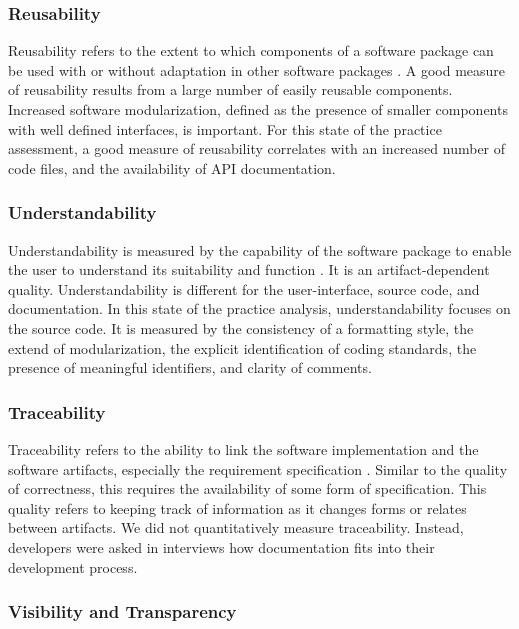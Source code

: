 \documentclass[final, 3p, times, authoryear]{elsarticle}
\begin{document}
\subsubsection{Reusability}

Reusability refers to the extent to which components of a software package can
be used with or without adaptation in other software packages
\citep{kalagiakos2003non}. A good measure of reusability results from a large
number of easily reusable components. Increased software modularization, defined
as the presence of smaller components with well defined interfaces, is
important. For this state of the practice assessment, a good measure of
reusability correlates with an increased number of code files, and the
availability of API documentation.

\subsubsection{Understandability}

Understandability is measured by the capability of the software package to
enable the user to understand its suitability and function \citep{ISO9126}. It
is an artifact-dependent quality. Understandability is different for the
user-interface, source code, and documentation. In this state of the practice
analysis, understandability focuses on the source code. It is measured by the
consistency of a formatting style, the extend of modularization, the explicit
identification of coding standards, the presence of meaningful identifiers, and
clarity of comments. 

\subsubsection{Traceability}

Traceability refers to the ability to link the software implementation and the
software artifacts, especially the requirement specification
\citep{McCallEtAl1977}. Similar to the quality of correctness, this requires the
availability of some form of specification. This quality refers to keeping track
of information as it changes forms or relates between artifacts. We did not
quantitatively measure traceability. Instead, developers were asked in
interviews how documentation fits into their development process.

\subsubsection{Visibility and Transparency}
\end{document}
